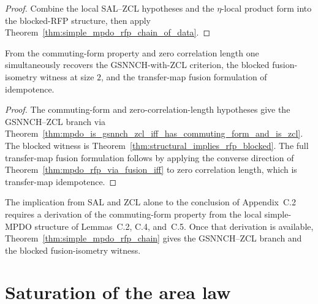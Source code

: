 \begin{proof}\leanok
    Combine the local SAL--ZCL hypotheses and the $\eta$-local product form into the
    blocked-RFP structure, then apply
    Theorem~\ref{thm:simple_mpdo_rfp_chain_of_data}.
\end{proof}

\begin{theorem}
    \label{thm:simple_mpdo_rfp_chain}
    \leanok
    From the commuting-form property and zero correlation length one
    simultaneously recovers the GSNNCH-with-ZCL criterion, the
    blocked fusion-isometry witness at size $2$, and the transfer-map fusion
    formulation of idempotence.
\end{theorem}

\begin{proof}\leanok
    The commuting-form and zero-correlation-length hypotheses give the GSNNCH--ZCL
    branch via Theorem~\ref{thm:mpdo_is_gsnnch_zcl_iff_has_commuting_form_and_is_zcl}.
    The blocked witness is Theorem~\ref{thm:structural_implies_rfp_blocked}. The
    full transfer-map fusion formulation follows by applying the converse direction
    of Theorem~\ref{thm:mpdo_rfp_via_fusion_iff} to zero correlation length, which
    is transfer-map idempotence.
\end{proof}

\begin{remark}
    \label{rem:simple_mpdo_rfp_chain_gap}
    \notready
    The implication from SAL and ZCL alone to the conclusion of Appendix~C.2
    requires a derivation of the commuting-form property from the local
    simple-MPDO structure of Lemmas~C.2, C.4, and~C.5. Once that derivation is available,
    Theorem~\ref{thm:simple_mpdo_rfp_chain} gives the GSNNCH--ZCL branch and
    the blocked fusion-isometry witness.
\end{remark}

\section{Saturation of the area law}

